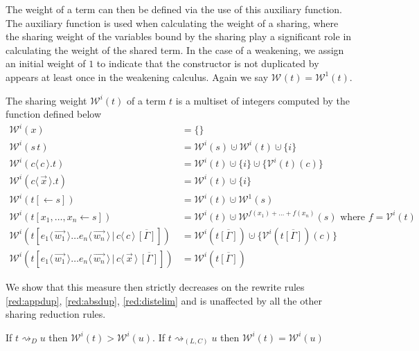 \documentclass[a4paper,UKenglish,cleveref, autoref]{lipics-v2019}
\newcommand{\set}[1]{ \{ #1 \} }
\newcommand{\app}[2]{#1 \, #2}
\newcommand{\fake}[3]{#1 \langle \, #2 \, \rangle . #3}
\newcommand{\share}[3]{#1 [#2 \leftarrow #3]}
\newcommand{\dist}[5]{#1 [ #2 \, \vert \, \fakedist{#4}{#5} \, #3 ]}
\newcommand{\fakedist}[2]{#1 \langle \, #2 \, \rangle}
\newcommand{\weight}[2]{\mathcal{W}^{#1}(#2)}
\newcommand{\weightvar}[2]{\mathcal{V}^{#1}(#2)}
\begin{document}
\noindent The weight of a term can then be defined via the use of this auxiliary function. The auxiliary function is used when calculating the weight of a sharing, where the sharing weight of the variables bound by the sharing play a significant role in calculating the weight of the shared term. In the case of a weakening, we assign an initial weight of $1$ to indicate that the constructor is not duplicated by appears at least once in the weakening calculus. Again we say $\weight{}{t} = \weight{1}{t}$.

\begin{definition}
The sharing weight $\weight{i}{t}$ of a term $t$ is a multiset of integers computed by the function defined below
\begingroup
\allowdisplaybreaks
\begin{align*}
	\weight{i}{x} &= \set{} \\
	\weight{i}{\app{s}{t}} &= \weight{i}{s} \cupdot \weight{i}{t} \cupdot \set{i}\\
	\weight{i}{\fake{c}{c}{t}} &= \weight{i}{t} \cupdot \set{i} \cupdot \set{\weightvar{i}{t}(c)} \\
	\weight{i}{\fake{c}{\vec{x}}{t}} &= \weight{i}{t} \cupdot \set{i} \\
	\weight{i}{\share{t}{}{s}} &= \weight{i}{t} \cupdot \weight{1}{s} \\
	\weight{i}{\share{t}{x_{1}, \dots, x_{n}}{s}} &= \weight{i}{t} \cupdot \weight{f(x_{1}) + \dots + f(x_{n})}{s} \text{ where } f = \weightvar{i}{t} \\
	\weight{i}{\dist{t}{\fakedist{e_{1}}{\vec{w_{1}}} \dots \fakedist{e_{n}}{\vec{w_{n}}}}{\overline{[\Gamma]}}{c}{c}} &= \weight{i}{t\overline{[\Gamma]}} \cupdot \set{\weightvar{i}{t\overline{[\Gamma]}} (c)} \\ %
	\weight{i}{\dist{t}{\fakedist{e_{1}}{\vec{w_{1}}} \dots \fakedist{e_{n}}{\vec{w_{n}}}}{\overline{[\Gamma]}}{c}{\vec{x}}} &= \weight{i}{t\overline{[\Gamma]}}
\end{align*}
\endgroup
\end{definition}

\noindent We show that this measure then strictly decreases on the rewrite rules \ref{red:appdup}, \ref{red:absdup}, \ref{red:distelim} and is unaffected by all the other sharing reduction rules.

\begin{lemma}
\label{theo:decreaseweight}
If $t \rightsquigarrow_{D} u$ then $\weight{i}{t} > \weight{i}{u}$. If $t \rightsquigarrow_{(L, C)} u$ then $\weight{i}{t} = \weight{i}{u}$
\end{lemma}
\end{document}
